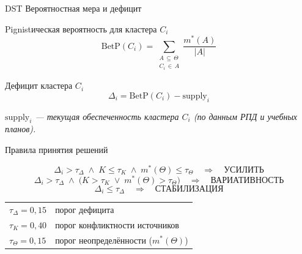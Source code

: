 \documentclass[12pt]{beamer}
\begin{document}
\begin{frame}{DST \textendash{} Вероятностная мера и дефицит}

  \begin{block}{Pignistическая вероятность для кластера $C_i$}
    \[
      \mathrm{BetP}(C_i) =
        \sum_{\substack{A \,\subseteq\, \Theta \\ C_i \,\in\, A}}
          \frac{m^*(A)}{|A|}
    \]
  \end{block}

  \begin{block}{Дефицит кластера $C_i$}
    \[
      \Delta_i = \mathrm{BetP}(C_i) - \mathrm{supply}_i
    \]
  \end{block}

  \bigskip
  \textit{$\mathrm{supply}_i$ --- текущая обеспеченность кластера $C_i$
          (по данным РПД и учебных планов).}
\end{frame}

\begin{frame}{Правила принятия решений}

  \begin{block}{}
    \[
      \Delta_i > \tau_\Delta
        \;\wedge\; K \leq \tau_K
        \;\wedge\; m^*(\Theta) \leq \tau_\Theta
      \quad\Longrightarrow\quad
      \textbf{УСИЛИТЬ}
    \]
    \[
      \Delta_i > \tau_\Delta
        \;\wedge\; \bigl(K > \tau_K \;\vee\; m^*(\Theta) > \tau_\Theta\bigr)
      \quad\Longrightarrow\quad
      \textbf{ВАРИАТИВНОСТЬ}
    \]
    \[
      \Delta_i \leq \tau_\Delta
      \quad\Longrightarrow\quad
      \textbf{СТАБИЛИЗАЦИЯ}
    \]
  \end{block}

  \bigskip
  \begin{tabular}{ll}
    $\tau_\Delta = 0{,}15$ & порог дефицита \\
    $\tau_K      = 0{,}40$ & порог конфликтности источников \\
    $\tau_\Theta = 0{,}15$ & порог неопределённости ($m^*(\Theta)$) \\
  \end{tabular}
\end{frame}

\end{document}
